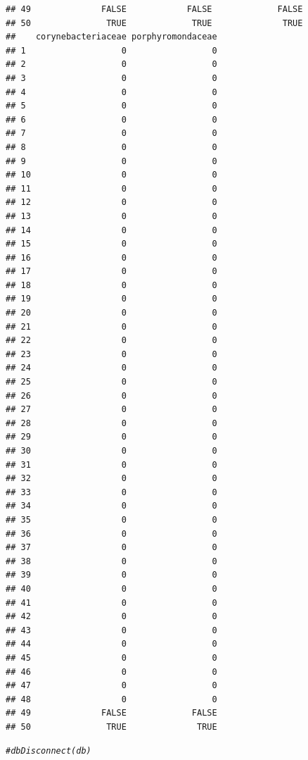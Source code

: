 \documentclass[12pt]{beamer}\usepackage[]{graphicx}\usepackage[]{color}
\makeatletter
\newcommand{\hlcom}[1]{\textcolor[rgb]{0.678,0.584,0.686}{\textit{#1}}}%
\newenvironment{kframe}{%
 \def\at@end@of@kframe{}%
 \ifinner\ifhmode%
  \def\at@end@of@kframe{\end{minipage}}%
  \begin{minipage}{\columnwidth}%
 \fi\fi%
 \def\FrameCommand##1{\hskip\@totalleftmargin \hskip-\fboxsep
 \colorbox{shadecolor}{##1}\hskip-\fboxsep
     \hskip-\linewidth \hskip-\@totalleftmargin \hskip\columnwidth}%
 \MakeFramed {\advance\hsize-\width
   \@totalleftmargin\z@ \linewidth\hsize
   \@setminipage}}%
 {\par\unskip\endMakeFramed%
 \at@end@of@kframe}
\newenvironment{knitrout}{}{} %
\makeatother
\begin{document}
\begin{frame}[fragile]
\begin{knitrout}
\begin{kframe}
\begin{verbatim}
## 49              FALSE            FALSE             FALSE
## 50               TRUE             TRUE              TRUE
##    corynebacteriaceae porphyromondaceae
## 1                   0                 0
## 2                   0                 0
## 3                   0                 0
## 4                   0                 0
## 5                   0                 0
## 6                   0                 0
## 7                   0                 0
## 8                   0                 0
## 9                   0                 0
## 10                  0                 0
## 11                  0                 0
## 12                  0                 0
## 13                  0                 0
## 14                  0                 0
## 15                  0                 0
## 16                  0                 0
## 17                  0                 0
## 18                  0                 0
## 19                  0                 0
## 20                  0                 0
## 21                  0                 0
## 22                  0                 0
## 23                  0                 0
## 24                  0                 0
## 25                  0                 0
## 26                  0                 0
## 27                  0                 0
## 28                  0                 0
## 29                  0                 0
## 30                  0                 0
## 31                  0                 0
## 32                  0                 0
## 33                  0                 0
## 34                  0                 0
## 35                  0                 0
## 36                  0                 0
## 37                  0                 0
## 38                  0                 0
## 39                  0                 0
## 40                  0                 0
## 41                  0                 0
## 42                  0                 0
## 43                  0                 0
## 44                  0                 0
## 45                  0                 0
## 46                  0                 0
## 47                  0                 0
## 48                  0                 0
## 49              FALSE             FALSE
## 50               TRUE              TRUE
\end{verbatim}
\begin{alltt}
\hlcom{#dbDisconnect(db)}
\end{alltt}
\end{kframe}
\end{knitrout}
\end{frame} 
\end{document}
